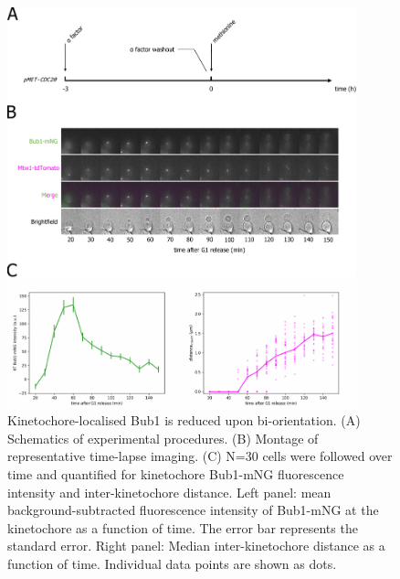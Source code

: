 \begin{figure}[htbp]
  \centering
  \includegraphics[width=0.9\textwidth]{figures/Bub1-mNG vs Mtw1-td.pdf}
  \caption[Kinetochore-localised Bub1 is reduced upon bi-orientation]{Kinetochore-localised Bub1 is reduced upon bi-orientation. (A) Schematics of experimental procedures. (B) Montage of representative time-lapse imaging. (C) N=30 cells were followed over time and quantified for kinetochore Bub1-mNG fluorescence intensity and inter-kinetochore distance. Left panel: mean background-subtracted fluorescence intensity of Bub1-mNG at the kinetochore as a function of time. The error bar represents the standard error. Right panel: Median inter-kinetochore distance as a function of time. Individual data points are shown as dots. }
  \label{fig:bub1mtw1}
\end{figure} 

